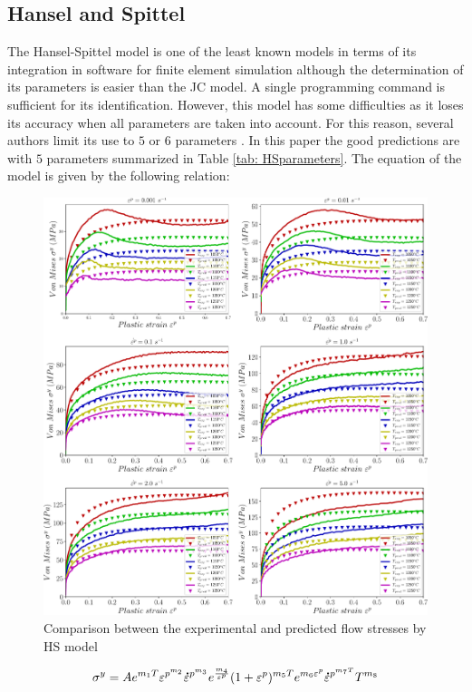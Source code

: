 \documentclass[twoside,english,1p,final,sort&compress]{elsarticle}
\theoremstyle{plain}
\newcommand{\mdot}[1]{\accentset{\mbox{\bfseries .}}{#1}}
\begin{document}
\subsection{Hansel and Spittel\label{sec:HSmodel}}
The Hansel-Spittel model is one of the least known models in terms of its  integration in software for finite element simulation although the determination of its parameters is easier than the JC model. A single programming command is sufficient for its identification. However, this model has some difficulties as it loses its accuracy when all parameters are taken into account. For this reason, several authors limit its use to $5$ or $6$ parameters \cite{chadha2018approach, rudnytskyj2020constitutive, el2015comparison}. In this paper the good predictions are with $5$ parameters summarized in Table \ref{tab: HSparameters}. The equation of the model is given by the following relation: 
\begin{figure}[!ht]
\centering
\includegraphics[width=1.02\columnwidth]
{newFigures/CompExpHS}
\caption{Comparison between the experimental and predicted flow stresses by HS model}
\label{fig:iCorrelationHS}
\end{figure}
\begin{equation}
\sigma^y = Ae^{m_1T}\varepsilon^{p^{m_2}}\mdot{\varepsilon}^{p^{m_3}}e^{\frac{m_4}{\varepsilon^p}}(1+\varepsilon^p)^{m_5T}e^{m_6\varepsilon^p}\mdot{\varepsilon}^{p^{m_7T}}T^{m_8}
\end{equation}
\end{document}
